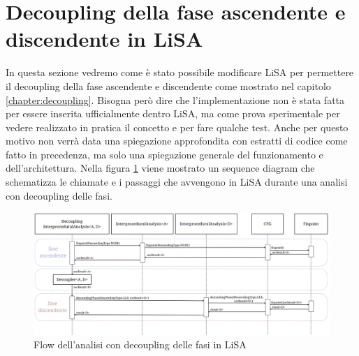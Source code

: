 \section{Decoupling della fase ascendente e discendente in LiSA}\label{sec:lisaDecoupling}
In questa sezione vedremo come è stato possibile modificare LiSA per permettere il decoupling della fase ascendente e discendente come mostrato nel capitolo \ref{chapter:decoupling}. Bisogna però dire che l'implementazione non è stata fatta per essere inserita ufficialmente dentro LiSA, ma come prova sperimentale per vedere realizzato in pratica il concetto e per fare qualche test. Anche per questo motivo non verrà data una spiegazione approfondita con estratti di codice come fatto in precedenza, ma solo una spiegazione generale del funzionamento e dell'architettura. Nella figura \ref{fig:flowDecoupling} viene mostrato un sequence diagram che schematizza le chiamate e i passaggi che avvengono in LiSA durante una analisi con decoupling delle fasi. 
\begin{figure}[ht]
	\centering
	\includegraphics[width=\textwidth]{Immagini/decouplingFlow.png}
	\caption{Flow dell'analisi con decoupling delle fasi in LiSA}
	\label{fig:flowDecoupling}
\end{figure}

